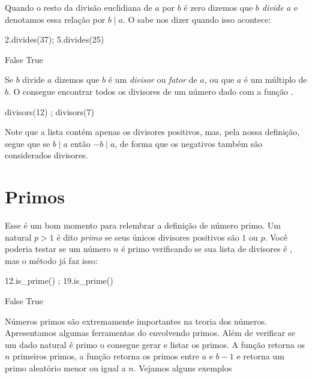 Quando o resto da divisão euclidiana de $a$ por $b$
é zero dizemos que \emph{$b$ divide $a$} e denotamos
essa relação por $b\mid a$. O \Sage sabe
nos dizer quando isso acontece:
\begin{sageinput}
2.divides(37); 5.divides(25)
\end{sageinput}
\begin{sageoutput}
False
True
\end{sageoutput}

Se $b$ divide $a$ dizemos que $b$ é um \emph{divisor}
ou \emph{fator} de $a$, ou que $a$ é um múltiplo de $b$.
O \Sage consegue encontrar todos os divisores 
de um número dado com a função .

\begin{sageinput}
divisors(12) ; divisors(7)
\end{sageinput}
\begin{sageoutput}
[1, 2, 3, 4, 6, 12]
[1, 7]
\end{sageoutput}

Note que a lista contém apenas os divisores positivos,
mas, pela nossa definição, segue que se $b\mid a$
então $-b\mid a$, de forma que os negativos também
são considerados divisores.

\section{Primos}


Esse é um bom momento para relembrar a definição
de número primo. Um natural $p>1$ é dito 
\emph{primo} se seus únicos divisores positivos são $1$ ou $p$.
Você poderia testar se um número $n$ é primo verificando
se sua lista de divisores é \ils{[1,p]}, mas
o método  já faz isso:
\begin{sageinput}
12.is_prime() ; 19.is_prime()
\end{sageinput}
\begin{sageoutput}
False
True
\end{sageoutput}

Números primos são extremamente importantes na teoria dos
números. Apresentamos algumas ferramentas
do \Sage envolvendo primos. Além de verificar se um dado natural 
é primo o \Sage consegue gerar e listar os primos. A função
 retorna os $n$ primeiros primos,
a função  retorna os primos entre $a$ e $b-1$
e  retorna um primo aleatório menor
ou igual a $n$. Vejamos alguns exemplos

